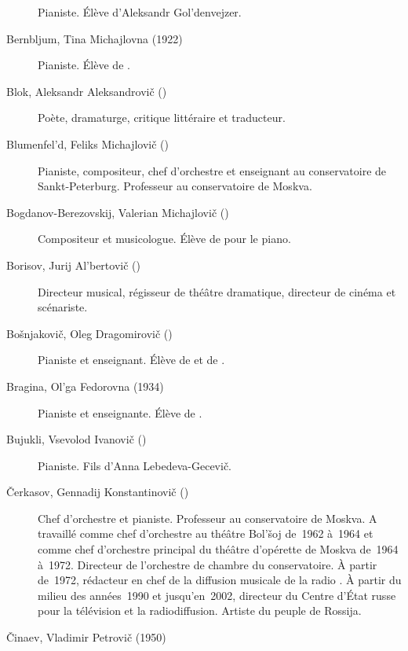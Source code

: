 \begin{description}
 Pianiste.
 Élève d'\hbox{Aleksandr} Gol'denvejzer.
 \item[Bernbljum, Tina Michajlovna (1922\dvsborn{})]%
 Pianiste.
 Élève de \VSofronitsky{}.
 \item[Blok, Aleksandr Aleksandrovič (\Dates{1880}{1921})]%
 Poète, dramaturge, critique littéraire et traducteur.
 \item[Blumenfel'd, Feliks Michajlovič (\Dates{1863}{1931})]%
 Pianiste, compositeur, chef d'orchestre et enseignant au conservatoire de
 Sankt-Peterburg.
 Professeur au conservatoire de Moskva.
 \item[Bogdanov-Berezovskij, Valerian Michajlovič (\Dates{1903}{1971})]%
 Compositeur et musicologue.
 Élève de \LNikolaiev{} pour le piano.
 \item[Borisov, Jurij Al'bertovič (\Dates{1956}{2007})]%
 Directeur musical, régisseur de théâtre dramatique, directeur de cinéma et
 scénariste.
 \item[Bošnjakovič, Oleg Dragomirovič (\Dates{1920}{2006})]%
 Pianiste et enseignant.
 Élève de \KIgumnov{} et de \HNeuhaus{}.
 \item[Bragina, Ol'ga Fedorovna (1934\dvsborn{})]%
 Pianiste et enseignante.
 Élève de \VSofronitsky{}.
 \item[Bujukli, Vsevolod Ivanovič (\Dates{1873}{1920})]%
 Pianiste.
 Fils d'\hbox{Anna} Lebedeva-Gecevič.
 \item[Čerkasov, Gennadij Konstantinovič (\Dates{1930}{2002})]%
 Chef d'orchestre et pianiste.
 Professeur au conservatoire de Moskva.
 A travaillé comme chef d'orchestre au théâtre Bol'šoj de~1962 à~1964 et
 comme chef d'orchestre principal du théâtre d'opérette de Moskva de~1964
 à~1972.
 Directeur de l'orchestre de chambre du conservatoire.
 À partir de~1972, rédacteur en chef de la diffusion musicale de la radio
 .
 À partir du milieu des années~1990 et jusqu'en~2002, directeur du Centre
 d'\hbox{État} russe pour la télévision et la radiodiffusion.
 Artiste du peuple de Rossija.
 \item[Činaev, Vladimir Petrovič (1950\dvsborn{})]%

\end{description}
